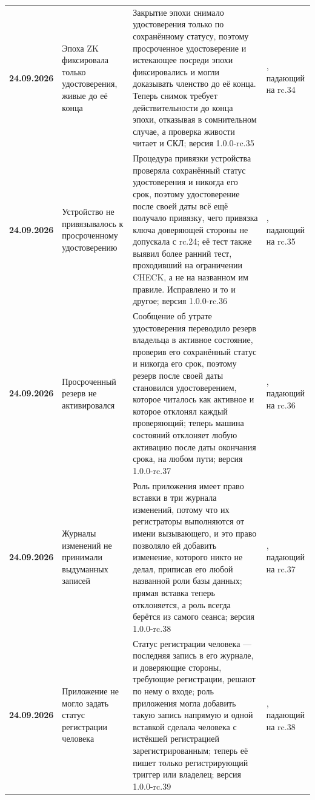 {\begin{xltabular}{\textwidth}{>{\bfseries\hspace{0pt}}p{0.74in} >{\RaggedRight\arraybackslash\hspace{0pt}}X >{\RaggedRight\arraybackslash\hspace{0pt}}X >{\RaggedRight\arraybackslash\hspace{0pt}}p{1.6in}}
24.09.2026 & Эпоха ZK фиксировала только удостоверения, живые до её конца & Закрытие эпохи снимало удостоверения только по сохранённому статусу, поэтому просроченное удостоверение и истекающее посреди эпохи фиксировались и могли доказывать членство до её конца. Теперь снимок требует действительности до конца эпохи, отказывая в сомнительном случае, а проверка живости читает и СКЛ; версия 1.0.0-rc.35 & , падающий на rc.34 \\
24.09.2026 & Устройство не привязывалось к просроченному удостоверению & Процедура привязки устройства проверяла сохранённый статус удостоверения и никогда его срок, поэтому удостоверение после своей даты всё ещё получало привязку, чего привязка ключа доверяющей стороны не допускала с rc.24; её тест также выявил более ранний тест, проходивший на ограничении CHECK, а не на названном им правиле. Исправлено и то и другое; версия 1.0.0-rc.36 & , падающий на rc.35 \\
24.09.2026 & Просроченный резерв не активировался & Сообщение об утрате удостоверения переводило резерв владельца в активное состояние, проверив его сохранённый статус и никогда его срок, поэтому резерв после своей даты становился удостоверением, которое читалось как активное и которое отклонял каждый проверяющий; теперь машина состояний отклоняет любую активацию после даты окончания срока, на любом пути; версия 1.0.0-rc.37 & , падающий на rc.36 \\
24.09.2026 & Журналы изменений не принимали выдуманных записей & Роль приложения имеет право вставки в три журнала изменений, потому что их регистраторы выполняются от имени вызывающего, и это право позволяло ей добавить изменение, которого никто не делал, приписав его любой названной роли базы данных; прямая вставка теперь отклоняется, а роль всегда берётся из самого сеанса; версия 1.0.0-rc.38 & , падающий на rc.37 \\
24.09.2026 & Приложение не могло задать статус регистрации человека & Статус регистрации человека --- последняя запись в его журнале, и доверяющие стороны, требующие регистрации, решают по нему о входе; роль приложения могла добавить такую запись напрямую и одной вставкой сделала человека с истёкшей регистрацией зарегистрированным; теперь её пишет только регистрирующий триггер или владелец; версия 1.0.0-rc.39 & , падающий на rc.38 \\

\end{xltabular}}
